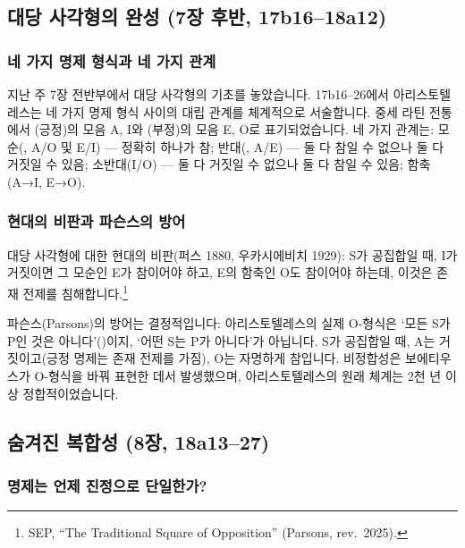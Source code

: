 \documentclass[12pt, a4paper]{article}
\begin{document}
\thispagestyle{firstpage}


\subsection{대당 사각형의 완성 (7장 후반, 17b16--18a12)}

\subsubsection{네 가지 명제 형식과 네 가지 관계}

지난 주 7장 전반부에서 대당 사각형의 기초를 놓았습니다. 17b16--26에서 아리스토텔레스는 네 가지 명제 형식 사이의 대립 관계를 체계적으로 서술합니다. 중세 라틴 전통에서 (긍정)의 모음 A, I와 (부정)의 모음 E, O로 표기되었습니다. 네 가지 관계는: 모순(, A/O 및 E/I) --- 정확히 하나가 참; 반대(, A/E) --- 둘 다 참일 수 없으나 둘 다 거짓일 수 있음; 소반대(I/O) --- 둘 다 거짓일 수 없으나 둘 다 참일 수 있음; 함축(A→I, E→O).

\subsubsection{현대의 비판과 파슨스의 방어}

대당 사각형에 대한 현대의 비판(퍼스 1880, 우카시에비치 1929): S가 공집합일 때, I가 거짓이면 그 모순인 E가 참이어야 하고, E의 함축인 O도 참이어야 하는데, 이것은 존재 전제를 침해합니다.\footnote{SEP, ``The Traditional Square of Opposition'' (Parsons, rev.\ 2025).}

파슨스(Parsons)의 방어는 결정적입니다: 아리스토텔레스의 실제 O-형식은 `모든 S가 P인 것은 아니다'()이지, `어떤 S는 P가 아니다'가 아닙니다. S가 공집합일 때, A는 거짓이고(긍정 명제는 존재 전제를 가짐), O는 자명하게 참입니다. 비정합성은 보에티우스가 O-형식을 바꿔 표현한 데서 발생했으며, 아리스토텔레스의 원래 체계는 2천 년 이상 정합적이었습니다.

\subsection{숨겨진 복합성 (8장, 18a13--27)}

\subsubsection{명제는 언제 진정으로 단일한가?}
\end{document}
